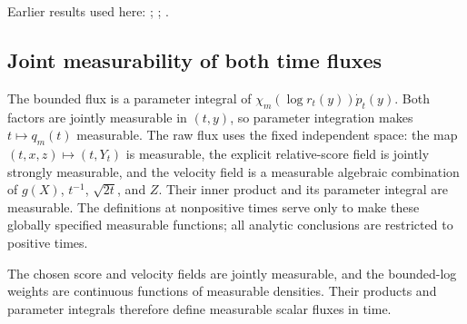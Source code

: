 \documentclass[11pt,a4paper]{report}
\begin{document}
Earlier results used here: \cite[Section~3.26.3]{LangevinLean2026ULASC}; \cite[Section~3.34.1]{LangevinLean2026ULASC}; \cite[Section~3.36.5]{LangevinLean2026ULASC}.
\subsection{\texorpdfstring{Joint measurability of both time fluxes}{Joint measurability of both time fluxes}}
\label{report-step-UnadjustedLangevin-LSI-GaussianEntropyIdentity-lean-19}


The bounded flux is a parameter integral of \(\chi_m(\log r_t(y))\dot p_t(y)\). Both factors are jointly measurable in \((t,y)\), so parameter integration makes \(t\mapsto q_m(t)\) measurable. The raw flux uses the fixed independent space: the map \((t,x,z)\mapsto(t,Y_t)\) is measurable, the explicit relative-score field is jointly strongly measurable, and the velocity field is a measurable algebraic combination of \(g(X)\), \(t^{-1}\), \(\sqrt{2t}\), and \(Z\). Their inner product and its parameter integral are measurable. The definitions at nonpositive times serve only to make these globally specified measurable functions; all analytic conclusions are restricted to positive times.



The chosen score and velocity fields are jointly measurable, and the bounded-log weights are continuous functions of measurable densities. Their products and parameter integrals therefore define measurable scalar fluxes in time.
\end{document}
